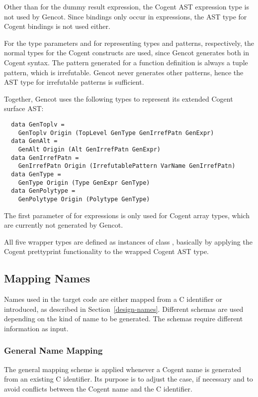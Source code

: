 Other than for the dummy result expression, the Cogent AST expression type is not used by Gencot. 
Since bindings only occur in expressions, the AST type for Cogent bindings is not used either.

For the type parameters  and  for representing types and patterns, respectively, the normal types for 
the Cogent constructs are used, since Gencot generates both in Cogent syntax. The pattern generated for a function
definition is always a tuple pattern, which is irrefutable. Gencot never generates other patterns, hence the AST
type for irrefutable patterns is sufficient. 

Together, Gencot uses the following types to represent its extended Cogent surface AST:
\begin{verbatim}
  data GenToplv =
    GenToplv Origin (TopLevel GenType GenIrrefPatn GenExpr)
  data GenAlt =
    GenAlt Origin (Alt GenIrrefPatn GenExpr)
  data GenIrrefPatn = 
    GenIrrefPatn Origin (IrrefutablePattern VarName GenIrrefPatn)
  data GenType = 
    GenType Origin (Type GenExpr GenType)
  data GenPolytype = 
    GenPolytype Origin (Polytype GenType)
\end{verbatim}
The first parameter of  for expressions is only used for Cogent array types, which are currently 
not generated by Gencot.

All five wrapper types are defined as instances of class , basically by applying the Cogent prettyprint
functionality to the wrapped Cogent AST type.

\subsection{Mapping Names}
\label{impl-ccode-names}

Names used in the target code are either mapped from a C identifier or introduced, as described in 
Section~\ref{design-names}. Different schemas are used depending on the kind of name to be generated.
The schemas require different information as input.

\subsubsection{General Name Mapping}

The general mapping scheme is applied whenever a Cogent name is generated from an existing C identifier.
Its purpose is to adjust the case, if necessary and to avoid conflicts between the Cogent name and
the C identifier.

